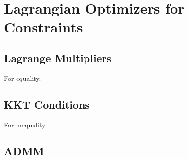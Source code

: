 \section{Lagrangian Optimizers for Constraints}

\subsection{Lagrange Multipliers}

  For equality. 

\subsection{KKT Conditions}

  For inequality. 

\subsection{ADMM}

